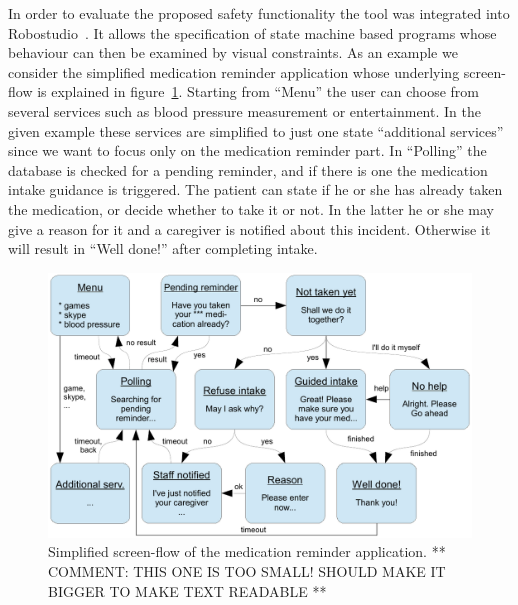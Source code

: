 \documentclass[conference]{IEEEtran}
\begin{document}
In order to evaluate the proposed safety functionality the tool was integrated into Robostudio~\cite{robostudio}. It allows the specification of state machine based programs whose behaviour can then be examined by visual constraints. As an example we consider the simplified medication reminder application whose underlying screen-flow is explained in figure~\ref{fig:medicationreminder}. Starting from ``Menu'' the user can choose from several services such as blood pressure measurement or entertainment. In the given example these services are simplified to just one state ``additional services'' since we want to focus only on the medication reminder part. In ``Polling'' the database is checked for a pending reminder, and if there is one the medication intake guidance is triggered. The patient can state if he or she has already taken the medication, or decide whether to take it or not. In the latter he or she may give a reason for it and a caregiver is notified about this incident. Otherwise it will result in ``Well done!'' after completing intake.


\begin{figure}[htbp]
  \centering
  \includegraphics[width=\linewidth]{stm} %
  \caption{Simplified screen-flow of the medication reminder application. ** COMMENT: THIS ONE IS TOO SMALL! SHOULD MAKE IT BIGGER TO MAKE TEXT READABLE **}
  \label{fig:medicationreminder}
\end{figure}





\end{document}
